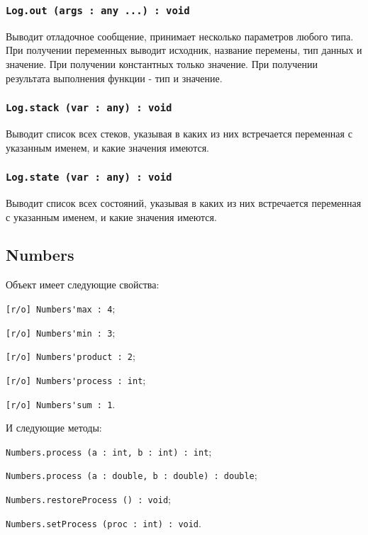 \subsubsection{\lstinline|Log.out (args : any ...) : void|}

Выводит отладочное сообщение, принимает несколько параметров любого типа. При получении переменных выводит исходник, название перемены, тип данных и значение. При получении константных только значение. При получении результата выполнения функции - тип и значение. 

\subsubsection{\lstinline|Log.stack (var : any) : void|}

Выводит список всех стеков, указывая в каких из них встречается переменная с указанным именем, и какие значения имеются.

\subsubsection{\lstinline|Log.state (var : any) : void|}

Выводит список всех состояний, указывая в каких из них встречается переменная с указанным именем, и какие значения имеются.

\subsection{{\color{orange} Numbers}}

Объект \numbers{} имеет следующие свойства:
\begin{icItems}
	\item \lstinline|[r/o] Numbers'max : 4|;
	\item \lstinline|[r/o] Numbers'min : 3|;
	\item \lstinline|[r/o] Numbers'product : 2|;
	\item \lstinline|[r/o] Numbers'process : int|;
	\item \lstinline|[r/o] Numbers'sum : 1|.
\end{icItems}

И следующие методы:
\begin{icItems}
	\item \lstinline|Numbers.process (a : int, b : int) : int|;
	\item \lstinline|Numbers.process (a : double, b : double) : double|;
	\item \lstinline|Numbers.restoreProcess () : void|;
	\item \lstinline|Numbers.setProcess (proc : int) : void|.
\end{icItems}

